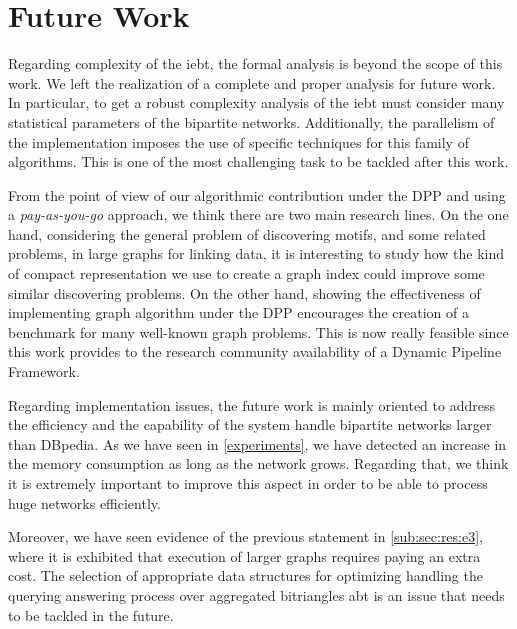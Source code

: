 \section{Future Work}

Regarding complexity of the \acrshort{iebt}, the formal analysis is beyond the scope of this work.  We left the realization of a complete and proper analysis for future work. In particular, to get a robust complexity analysis of the \acrshort{iebt} must consider many statistical parameters of the bipartite networks. Additionally,  the parallelism of the implementation imposes the use of specific techniques for this family of algorithms. This is one of the most challenging task to be tackled after this work.

From the point of view of our algorithmic contribution  under the DPP and using a \textit{pay-as-you-go} approach, we think there are two main research lines. On the one hand,  considering  the general problem of discovering motifs,  and some related problems, in large graphs for linking data, it is interesting to study how the  kind of compact representation we use to create a graph index could improve some similar discovering problems. On the other hand, showing the effectiveness of implementing graph algorithm under the DPP encourages the creation of a benchmark  for many well-known graph problems. This is now really feasible since this work  provides to the research community  availability of a Dynamic Pipeline Framework. 


 Regarding implementation issues, the future work is mainly oriented to address the efficiency and the capability of the system handle bipartite networks  larger than DBpedia. As we have seen in \autoref{experiments}, we have detected an increase in the memory consumption as long as the network grows. 
Regarding that, we think it is extremely important to improve this aspect in order to be able to process huge networks efficiently. 

Moreover, we have seen evidence of the previous statement in \autoref{sub:sec:res:e3}, where it is exhibited that execution of larger graphs requires paying an extra cost.
The selection of appropriate data structures for optimizing handling the querying answering process over aggregated bitriangles  \acrlong{abt} is an issue that needs to be tackled in the future. 


